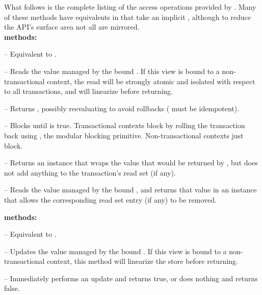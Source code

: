 What follows is the complete listing of the access operations provided by
.  Many of these methods have equivalents in 
that take an implicit , although to reduce the API's surface
area not all are mirrored. \vspace{4pt}\\
\textbf{ methods:}
\begin{packed_itemize}

\item {} -- Equivalent to .

\item {} -- Reads the value managed by the
bound .  If this view is bound to a non-transactional context,
the read will be strongly atomic and isolated with respect to all
transactions, and will linearize before returning.

\item \code{map[}\typeparam{Z}{](f: }
-- Returns , possibly reevaluating 
to avoid rollbacks ( must be idempotent).

\item {}\code{)} -- Blocks
until  is true.  Transactional contexts block by rolling
the transaction back using , the modular blocking primitive.
Non-transactional contexts just block.

\item {}\code{[}\typeparam{T}{]}
-- Returns an instance that wraps the value that would be returned by
, but does not add anything to the transaction's read set
(if any).

\item {}\code{[}\typeparam{T}{]}
-- Reads the value managed by the bound , and returns that
value in an instance that allows the corresponding read set entry (if any)
to be removed.

\end{packed_itemize}
\textbf{ methods:}
\begin{packed_itemize}

\item {} -- Equivalent to .

\item {} -- Updates the value managed by the
bound .  If this view is bound to a non-transactional context,
this method will linearize the store before returning.

\item {} -- Immediately
performs an update and returns true, or does nothing and returns false.

\end{packed_itemize}
